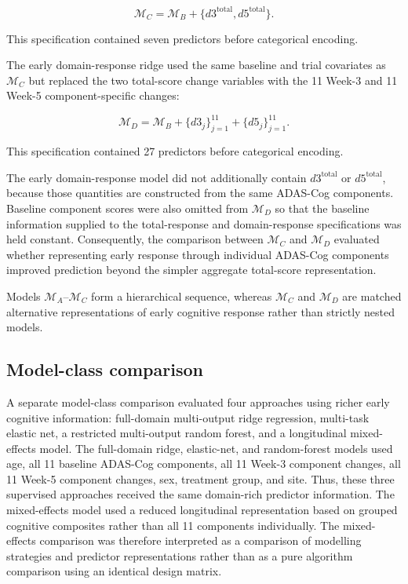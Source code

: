 \documentclass[11pt]{article}
\begin{document}
\begin{equation}
\mathcal{M}_{C}
=
\mathcal{M}_{B}
+
\{
d3^{\mathrm{total}},
d5^{\mathrm{total}}
\}.
\end{equation}

This specification contained seven predictors before categorical encoding.

The early domain-response ridge used the same baseline and trial covariates as
$\mathcal{M}_{C}$ but replaced the two total-score change variables with the 11 Week-3
and 11 Week-5 component-specific changes:

\begin{equation}
\mathcal{M}_{D}
=
\mathcal{M}_{B}
+
\{d3_j\}_{j=1}^{11}
+
\{d5_j\}_{j=1}^{11}.
\end{equation}

This specification contained 27 predictors before categorical encoding.

The early domain-response model did not additionally contain
$d3^{\mathrm{total}}$ or $d5^{\mathrm{total}}$, because those quantities are constructed
from the same ADAS-Cog components. Baseline component scores were also omitted from
$\mathcal{M}_{D}$ so that the baseline information supplied to the total-response and
domain-response specifications was held constant. Consequently, the comparison between
$\mathcal{M}_{C}$ and $\mathcal{M}_{D}$ evaluated whether representing early response
through individual ADAS-Cog components improved prediction beyond the simpler aggregate
total-score representation.

Models $\mathcal{M}_{A}$--$\mathcal{M}_{C}$ form a hierarchical sequence, whereas
$\mathcal{M}_{C}$ and $\mathcal{M}_{D}$ are matched alternative representations of
early cognitive response rather than strictly nested models.


\subsection{Model-class comparison}

A separate model-class comparison evaluated four approaches using richer early cognitive
information: full-domain multi-output ridge regression, multi-task elastic net,
a restricted multi-output random forest, and a longitudinal mixed-effects model. The full-domain ridge, elastic-net, and random-forest models used age, all 11 baseline
ADAS-Cog components, all 11 Week-3 component changes, all 11 Week-5 component changes,
sex, treatment group, and site. Thus, these three supervised approaches received the same
domain-rich predictor information. The mixed-effects model used a reduced longitudinal representation based on grouped
cognitive composites rather than all 11 components individually. The mixed-effects
comparison was therefore interpreted as a comparison of modelling strategies and predictor
representations rather than as a pure algorithm comparison using an identical design matrix.
\end{document}

